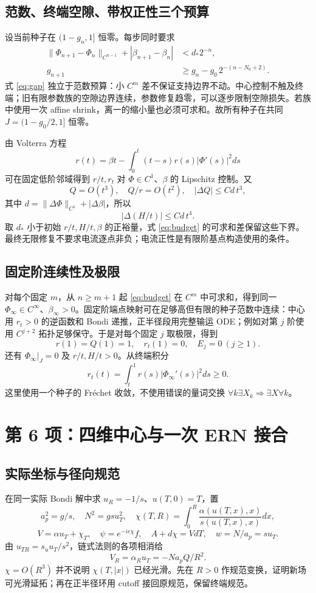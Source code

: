 \subsection{范数、终端空隙、带权正性三个预算}
设当前种子在 $(1-g_n,1]$ 恒零。每步同时要求
\begin{align}
\|\Phi_{n+1}-\Phi_n\|_{C^{n-1}}+|\beta_{n+1}-\beta_n|
&<d_*2^{-n},\label{eq:budget}\\
g_{n+1}&\ge g_n-g_0\,2^{-(n-N_0+2)}.\label{eq:gap}
\end{align}
式 \eqref{eq:gap} 独立于范数预算：小 $C^m$ 差不保证支持边界不动。中心控制不触及终端；旧有限参数族的空隙边界连续，参数修复趋零，可以逐步限制空隙损失。若族中使用一次 affine shrink，离一的缩小量也必须可求和。故所有种子在共同 $J=(1-g_0/2,1]$ 恒零。

由 Volterra 方程
\[
r(t)=\beta t-\int_0^t(t-s)r(s)|\Phi'(s)|^2ds
\]
可在固定低阶邻域得到 $r/t,r_t$ 对 $\Phi\in C^1$、$\beta$ 的 Lipschitz 控制。又
\[
Q=O(t^3),\quad Q/r=O(t^2),\quad
|\Delta Q|\le Cd\,t^3,
\]
其中 $d=\|\Delta\Phi\|_{C^1}+|\Delta\beta|$，所以
\[
|\Delta(H/t)|\le Cd\,t^4.
\]
取 $d_*$ 小于初始 $r/t,H/t,\beta$ 的正裕量，式 \eqref{eq:budget} 的可求和差保留这些下界。最终无限修复不要求电流逐点非负；电流正性是有限阶基点构造使用的条件。

\subsection{固定阶连续性及极限}
对每个固定 $m$，从 $n\ge m+1$ 起 \eqref{eq:budget} 在 $C^m$ 中可求和，得到同一 $\Phi_\infty\in C^\infty$、$\beta_\infty>0$。固定阶端点映射可在足够高但有限的种子范数中连续：中心用 $r_t>0$ 的逆函数和 Bondi 递推，正半径段用完整输运 ODE；例如对第 $j$ 阶使用 $C^{j+2}$ 拓扑足够保守。于是对每个固定 $j$ 取极限，得到
\begin{equation}\label{eq:allzero}
\boxed{r(1)=Q(1)=1,\quad r_t(1)=0,\quad E_j=0\ (j\ge1).}
\end{equation}
还有 $\Phi_\infty|_J=0$ 及 $r/t,H/t>0$。从终端积分
\[
r_t(t)=\int_t^1r(s)|\Phi_\infty'(s)|^2ds\ge0.
\]
这里使用一个种子的 Fr\'echet 收敛，不使用错误的量词交换 $\forall k\exists X_k\Rightarrow\exists X\forall k$。

\section{第 6 项：四维中心与一次 ERN 接合}
\subsection{实际坐标与径向规范}
在同一实际 Bondi 解中求 $u_R=-1/s$、$u(T,0)=T$，置
\[
a_p^2=g/s,\quad N^2=gsu_T^2,\quad
\chi(T,R)=\int_0^R\frac{\alpha(u(T,x),x)}{s(u(T,x),x)}dx,
\]
\[
V=\alpha u_T+\chi_T,\quad\psi=e^{-ie\chi}f,
\quad A+d\chi=VdT,\quad w=N/a_p=su_T.
\]
由 $u_{TR}=s_uu_T/s^2$，链式法则的各项相消给
\[
V_R=\alpha_Ru_T=-Na_pQ/R^2.
\]
$\chi=O(R^3)$ 并不说明 $\chi(T,|x|)$ 已经光滑。先在 $R>0$ 作规范变换，证明新场可光滑延拓；再在正半径环用 cutoff 接回原规范，保留终端规范。

